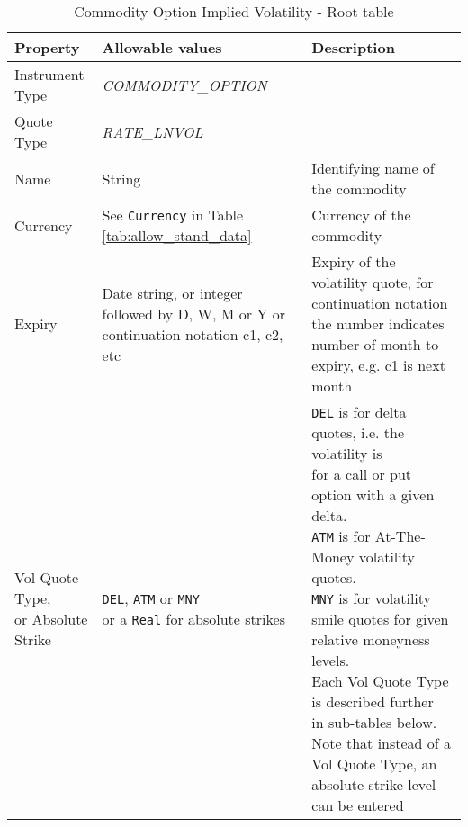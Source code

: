 \begin{table}[H]
	\centering
	\begin{tabular}{|p{3.1cm}|p{5.5cm}|p{7.7cm}|}
		\hline
		{\bf Property} & {\bf Allowable values} & {\bf Description} \\ \hline
        Instrument Type & \emph{COMMODITY\_OPTION} & \\ \hline
        Quote Type & \emph{RATE\_LNVOL} & \\ \hline
        Name & String & Identifying name of the commodity \\ \hline
        Currency & See \lstinline!Currency! in Table \ref{tab:allow_stand_data}&  Currency of the commodity \\ \hline
        Expiry & Date string, or integer followed by D, W, M or Y or continuation notation c1, c2, etc & Expiry of the volatility quote, for continuation notation the number indicates number of month to expiry, e.g. c1 is next month \\ \hline
        \makecell[tl]{Vol Quote Type, \\ or Absolute Strike}  & \makecell[tl]{{\tt DEL}, {\tt ATM} or {\tt MNY} \\ or a {\tt Real} for absolute strikes} & \makecell[tl]{{\tt DEL} is for delta quotes, i.e. the volatility is \\ for a call or put option with a given delta. \\ {\tt ATM} is for At-The-Money volatility quotes. \\ {\tt MNY} is for volatility smile quotes for given \\ relative moneyness levels. \\ Each Vol Quote Type is described further \\ in sub-tables below.\\ Note that instead of a Vol Quote Type, an \\ absolute strike level can be entered}\\ \hline
	\end{tabular}
	\caption{Commodity Option Implied Volatility - Root table}
	\label{tab:comimplvol_quote}
\end{table}

